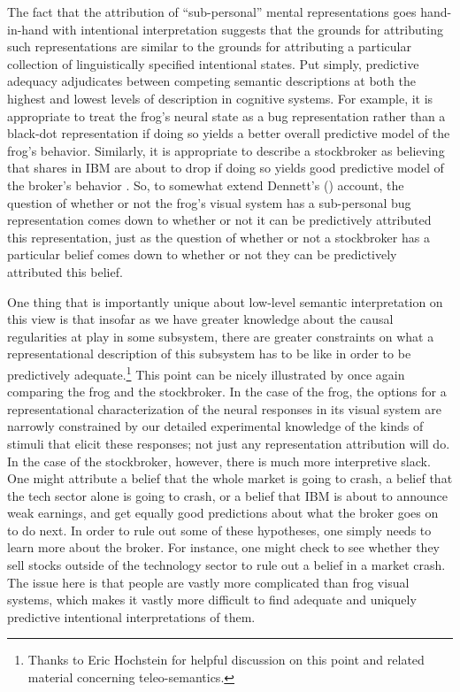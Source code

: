 The fact that the attribution of ``sub-personal'' mental representations goes hand-in-hand with intentional interpretation suggests that the grounds for attributing such representations are similar to the grounds for attributing a particular collection of linguistically specified intentional states. Put simply, predictive adequacy adjudicates between competing semantic descriptions at both the highest and lowest levels of description in cognitive systems. For example, it is appropriate to treat the frog's neural state as a bug representation rather than a black-dot representation if doing so yields a better overall predictive model of the frog's behavior. Similarly, it is appropriate to describe a stockbroker as believing that shares in IBM are about to drop if doing so yields good predictive model of the broker's behavior \citep[][pp. 24-26]{Dennett:1987}. So, to somewhat extend Dennett's (\citeyear{Dennett:1987}) account, the question of whether or not the frog's visual system has a sub-personal bug representation comes down to whether or not it can be predictively attributed this representation, just as the question of whether or not a stockbroker has a particular belief comes down to whether or not they can be predictively attributed this belief. 

One thing that is importantly unique about low-level semantic interpretation on this view is that insofar as we have greater knowledge about the causal regularities at play in some subsystem, there are greater constraints on what a representational description of this subsystem has to be like in order to be predictively adequate.\footnote{Thanks to Eric Hochstein for helpful discussion on this point and related material concerning teleo-semantics.} This point can be nicely illustrated by once again comparing the frog and the stockbroker. In the case of the frog, the options for a representational characterization of the neural responses in its visual system are narrowly constrained by our detailed experimental knowledge of the kinds of stimuli that elicit these responses; not just any representation attribution will do. In the case of the stockbroker, however, there is much more interpretive slack. One might attribute a belief that the whole market is going to crash, a belief that the tech sector alone is going to crash, or a belief that IBM is about to announce weak earnings, and get equally good predictions about what the broker goes on to do next. In order to rule out some of these hypotheses, one simply needs to learn more about the broker. For instance, one might check to see whether they sell stocks outside of the technology sector to rule out a belief in a market crash. The issue here is that people are vastly more complicated than frog visual systems, which makes it vastly more difficult to find adequate and uniquely predictive intentional interpretations of them. 

